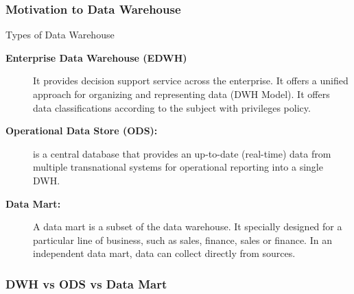 \begin{frame}
\frametitle{Motivation to Data Warehouse}
Types of Data Warehouse
\begin{description}
\item [\textbf{Enterprise Data Warehouse (EDWH)}] It provides decision support service across the enterprise. It offers a unified approach for organizing and representing data (DWH Model). It offers data classifications according to the subject with privileges policy.
\item [\textbf{Operational Data Store (ODS):}] is a central database that provides an up-to-date (real-time) data from multiple transnational systems for operational reporting into a single DWH.

\item [\textbf{Data Mart:}] A data mart is a subset of the data warehouse. It specially designed for a particular line of business, such as sales, finance, sales or finance. In an independent data mart, data can collect directly from sources.
\end{description}

\end{frame}



\begin{frame}
\frametitle{DWH vs ODS vs Data Mart}


\begin{table}[t]
\centering	
{}
\end{table}
\end{frame}


